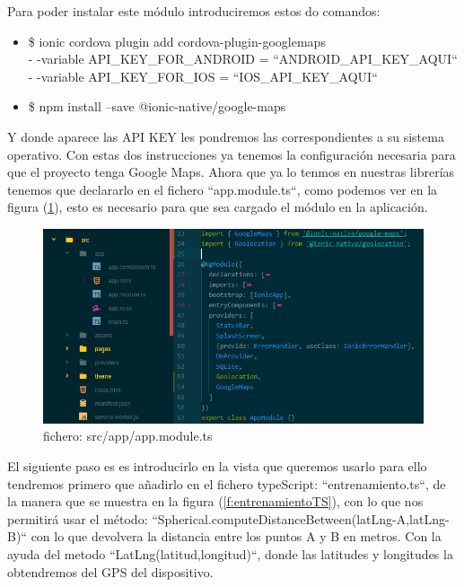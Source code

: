 \documentclass[a4paper, 11pt]{article}
\begin{document}
\begin{itemize}
              Para poder instalar este módulo introduciremos estos do comandos:\\
                \begin{itemize}
                    \item{\$ ionic cordova plugin add cordova-plugin-googlemaps\\
                    - -variable API\_KEY\_FOR\_ANDROID = ``ANDROID\_API\_KEY\_AQUI``\\
                    - -variable API\_KEY\_FOR\_IOS = ``IOS\_API\_KEY\_AQUI`` }
                    \item{\$ npm install --save @ionic-native/google-maps}
                \end{itemize}

               Y donde aparece las API KEY les pondremos las correspondientes a
               su sistema operativo. Con estas dos instrucciones ya tenemos la
               configuración necesaria para que el proyecto tenga Google Maps.
               Ahora que ya lo tenmos en nuestras librerías tenemos que
               declararlo en el fichero ``app.module.ts``, como podemos ver en
               la figura (\ref{f:module.ts}), esto es necesario para que sea
               cargado el módulo en la aplicación.\\

               \begin{figure}[H]
                 \centering
                      \includegraphics[width=\textwidth]{geolocalizacion-googlemaps}
                      \caption{fichero: src/app/app.module.ts}
                      \label{f:module.ts}
                \end{figure}

               El siguiente paso es es introducirlo en la vista que queremos
               usarlo para ello tendremos primero que añadirlo en el fichero
               typeScript: ``entrenamiento.ts``, de la manera que se muestra en
               la figura (\ref{f:entrenamientoTS}), con lo que nos permitirá
               usar el método: ``Spherical.computeDistanceBetween(latLng-A,latLng-B)``
               con lo que devolvera la distancia entre los puntos A y B en metros.
               Con la ayuda del metodo ``LatLng(latitud,longitud)``, donde las
               latitudes y longitudes la obtendremos del GPS del dispositivo.\\


\end{itemize}
\end{document}
